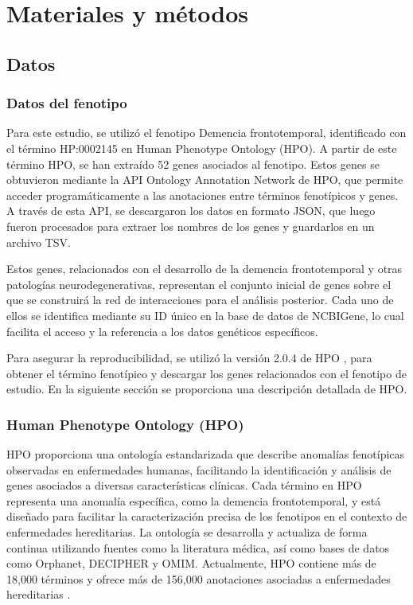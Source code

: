 \section{Materiales y métodos}

\subsection{Datos}

\vspace{0,3cm}

\subsubsection*{Datos del fenotipo}

Para este estudio, se utilizó el fenotipo Demencia frontotemporal, identificado con el término HP:0002145 en Human Phenotype Ontology (HPO). A partir de este término HPO, se han extraído 52 genes asociados al fenotipo. Estos genes se obtuvieron mediante la API Ontology Annotation Network \cite{hpo_api} de HPO, que permite acceder programáticamente a las anotaciones entre términos fenotípicos y genes. A través de esta API, se descargaron los datos en formato JSON, que luego fueron procesados para extraer los nombres de los genes y guardarlos en un archivo TSV.

Estos genes, relacionados con el desarrollo de la demencia frontotemporal y otras patologías neurodegenerativas, representan el conjunto inicial de genes sobre el que se construirá la red de interacciones para el análisis posterior. Cada uno de ellos se identifica mediante su ID único en la base de datos de NCBIGene, lo cual facilita el acceso y la referencia a los datos genéticos específicos.

Para asegurar la reproducibilidad, se utilizó la versión 2.0.4 de HPO  \cite{HPO}, para obtener el término fenotípico y descargar los genes relacionados con el fenotipo de estudio. En la siguiente sección se proporciona una descripción detallada de HPO.
 
\subsubsection*{Human Phenotype Ontology (HPO)}

HPO proporciona una ontología estandarizada que describe anomalías fenotípicas observadas en enfermedades humanas, facilitando la identificación y análisis de genes asociados a diversas características clínicas. Cada término en HPO representa una anomalía específica, como la demencia frontotemporal, y está diseñado para facilitar la caracterización precisa de los fenotipos en el contexto de enfermedades hereditarias. La ontología se desarrolla y actualiza de forma continua utilizando fuentes como la literatura médica, así como bases de datos como Orphanet, DECIPHER y OMIM. Actualmente, HPO contiene más de 18,000 términos y ofrece más de 156,000 anotaciones asociadas a enfermedades hereditarias \cite{HPO}.


